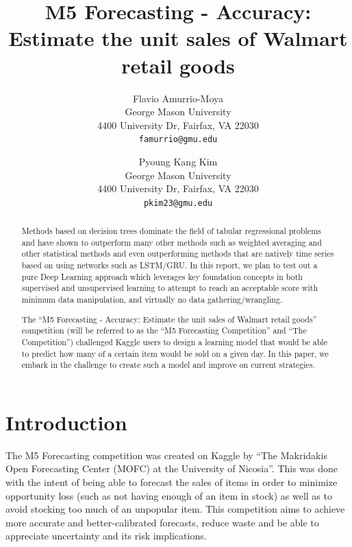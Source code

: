 \documentclass[10pt,twocolumn,letterpaper]{article}
\begin{document}
\title{M5 Forecasting - Accuracy: Estimate the unit sales of Walmart retail goods}

\author{Flavio Amurrio-Moya\\
George Mason University\\
4400 University Dr, Fairfax, VA 22030\\
{\tt\small famurrio@gmu.edu}
\and
Pyoung Kang Kim\\
George Mason University\\
4400 University Dr, Fairfax, VA 22030\\
{\tt\small pkim23@gmu.edu}
}

\maketitle
\thispagestyle{empty}

\begin{abstract}
  Methods based on decision trees dominate the field of tabular regressional
  problems and have shown to outperform many other methods such as weighted
  averaging and other statistical methods and even outperforming methods that
  are natively time series based on using networks such as LSTM/GRU. In this
  report, we plan to test out a pure Deep Learning approach which leverages key
  foundation concepts in both supervised and unsupervised learning to attempt to
  reach an acceptable score with minimum data manipulation, and virtually no
  data gathering/wrangling.

  The ``M5 Forecasting - Accuracy: Estimate the unit sales of Walmart retail
  goods'' competition (will be referred to as the ``M5 Forecasting Competition''
  and ``The Competition'') challenged Kaggle users to design a learning model
  that would be able to predict how many of a certain item would be sold on a
  given day. In this paper, we embark in the challenge to create such a model
  and improve on current strategies.

\end{abstract}

\section{Introduction}
The M5 Forecasting competition was created on Kaggle by ``The Makridakis Open
Forecasting Center (MOFC) at the University of Nicosia''. This was done with the
intent of being able to forecast the sales of items in order to minimize
opportunity loss (such as not having enough of an item in stock) as well as to
avoid stocking too much of an unpopular item. This competition aims to achieve
more accurate and better-calibrated forecasts, reduce waste and be able to
appreciate uncertainty and its risk implications.
\end{document}

